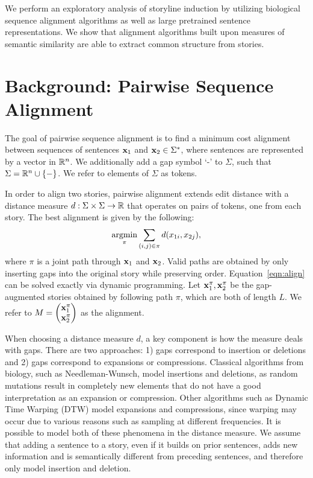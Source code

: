 \documentclass{article}
\begin{document}
We perform an exploratory analysis of storyline induction by utilizing 
biological sequence alignment algorithms as well as large pretrained sentence representations.
We show that alignment algorithms built upon measures of semantic similarity 
are able to extract common structure from stories.

\section{Background: Pairwise Sequence Alignment}
The goal of pairwise sequence alignment is to find a minimum cost alignment
between sequences of sentences $\mathbf{x}_1$ and $\mathbf{x}_2\in\Sigma^*$, where
sentences are represented by a vector in $\mathbb{R}^n$.
We additionally add a gap symbol `-' to $\Sigma$, such that 
$\Sigma = \mathbb{R}^n \cup \left\{-\right\}$.
We refer to elements of $\Sigma$ as tokens.

In order to align two stories, pairwise alignment extends edit distance
with a distance measure $d: \Sigma\times\Sigma\to\mathbb{R}$ that operates on pairs of tokens,
one from each story.
The best alignment is given by the following:
\begin{equation}
\label{eqn:align}
\operatorname*{argmin}_\pi \sum_{(i, j) \in \pi} d(x_{1i},x_{2j}),
\end{equation}
where $\pi$ is a joint path through $\mathbf{x}_1$ and $\mathbf{x}_2$.
Valid paths are obtained by only inserting gaps into the original story
while preserving order.
Equation~\ref{eqn:align} can be solved exactly via dynamic programming.
Let $\mathbf{x}^\pi_1,\mathbf{x}^\pi_2$ be the gap-augmented stories obtained by following path $\pi$,
which are both of length $L$.
We refer to 
$M = \begin{pmatrix}\mathbf{x}^\pi_1 \\ \mathbf{x}^\pi_2 \end{pmatrix}$
as the alignment.

When choosing a distance measure $d$, a key component is how the measure deals with gaps.
There are two approaches: 1) gaps correspond to insertion or deletions and 2) gaps
correspond to expansions or compressions.
Classical algorithms from biology, such as Needleman-Wunsch, model insertions and deletions,
as random mutations result in completely new elements that do not have a good interpretation
as an expansion or compression.
Other algorithms such as Dynamic Time Warping (DTW) model expansions and compressions,
since warping may occur due to various reasons such as sampling at different frequencies.
It is possible to model both of these phenomena in the distance measure.
We assume that adding a sentence to a story, even if it builds on prior sentences,
adds new information and is semantically different from preceding sentences,
and therefore only model insertion and deletion.
\end{document}
